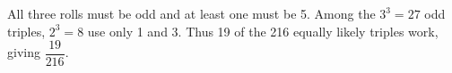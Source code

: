 All three rolls must be odd and at least one must be 5. Among the $3^3=27$ odd triples, $2^3=8$ use only 1 and 3. Thus 19 of the 216 equally likely triples work, giving $\boxed{\dfrac{19}{216}}$.
